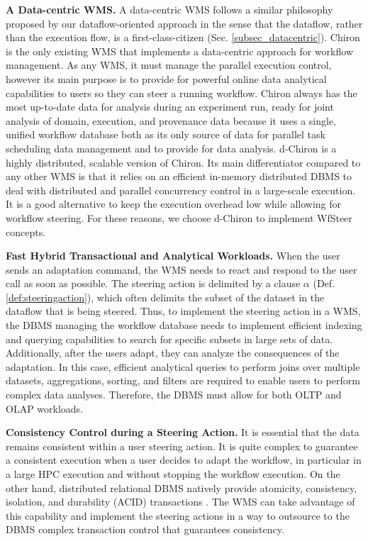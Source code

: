\textbf{A Data-centric WMS.} A data-centric WMS follows a similar philosophy
proposed by our dataflow-oriented approach in the sense that the dataflow, rather than the execution flow, is a first-class-citizen (Sec. \ref{subsec_datacentric}).
Chiron \cite{Ogasawara2011algebraic, Dias2015Data-centric}
is the only existing WMS that implements a data-centric approach for workflow management.
As any WMS, it must manage the parallel execution control, however
its main purpose is to provide for powerful online data analytical capabilities to users so they can steer a running workflow.
Chiron always has the most up-to-date data for analysis during an experiment
run, ready for joint analysis of domain, execution, and provenance data because it uses a single, unified workflow database both as its only source of data for
parallel task scheduling data management and to provide for data analysis.
d-Chiron \cite{Souza2015Parallel} is a highly distributed, scalable version of Chiron.
Its main differentiator compared to any other WMS is that it relies on an
 efficient in-memory distributed DBMS to deal with distributed and parallel concurrency control in a large-scale execution. It is a good alternative to keep the execution overhead low while allowing for workflow steering.
 For these reasons, we choose d-Chiron to implement WfSteer concepts.

\textbf{Fast Hybrid Transactional and Analytical Workloads.}
When the user sends an adaptation command,
the WMS needs to react and respond to the user call as soon as possible.
The steering action is delimited by a clause $\alpha$ (Def. \ref{def:steeringaction}), which often delimits the
subset of the dataset in the dataflow that is being steered.
Thus, to implement the steering action in a WMS,
the DBMS managing the workflow database needs to implement efficient indexing and  querying capabilities
to search for specific subsets in large sets of data.
Additionally, after the users adapt, they can analyze the
consequences of the adaptation. In this case, efficient
analytical queries to perform joins over multiple datasets,
aggregations, sorting, and filters are required to enable users
to perform complex data analyses. Therefore, the DBMS
must allow for both OLTP and OLAP workloads.

\textbf{Consistency Control during a Steering Action.} It is essential
that the data remains consistent within a user steering action.
It is quite complex to guarantee a consistent execution when a user
decides to adapt the workflow, in particular in a large HPC execution and
without stopping the workflow execution.
On the other hand, distributed relational DBMS natively provide atomicity, consistency,
isolation, and durability (ACID) transactions \cite{Ozsu2011Principles}.
The WMS can take advantage of this capability and implement the steering actions in a way to outsource to the DBMS complex transaction control that guarantees consistency.

